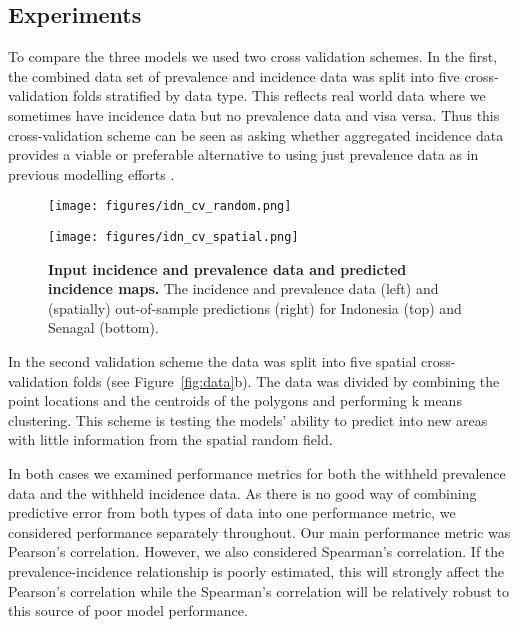 \documentclass[10pt,letterpaper]{article}
\begin{document}
\subsection*{Experiments}

To compare the three models we used two cross validation schemes. 
In the first, the combined data set of prevalence and incidence data was split into five cross-validation folds stratified by data type.
This reflects real world data where we sometimes have incidence data but no prevalence data and visa versa.
Thus this cross-validation scheme can be seen as asking whether aggregated incidence data provides a viable or preferable alternative to using just prevalence data as in previous modelling efforts \cite{bhatt2015effect}.


\begin{figure}[!h]
\centering
\begin{minipage}{0.45\textwidth} \centering 
\texttt{[image: figures/idn\_cv\_random.png]} %
\end{minipage}
\begin{minipage}{0.45\textwidth} \centering 
\texttt{[image: figures/idn\_cv\_spatial.png]} %
\end{minipage}

\caption{{\bf Input incidence and prevalence data and predicted incidence maps. } The incidence and prevalence data (left) and (spatially) out-of-sample predictions (right) for Indonesia (top) and Senagal (bottom).}
\label{fig1}
\end{figure}





In the second validation scheme the data was split into five spatial cross-validation folds (see Figure~\ref{fig:data}b).
The data was divided by combining the point locations and the centroids of the polygons and performing k means clustering.
This scheme is testing the models' ability to predict into new areas with little information from the spatial random field.

In both cases we examined performance metrics for both the withheld prevalence data and the withheld incidence data.
As there is no good way of combining predictive error from both types of data into one performance metric, we considered performance separately throughout.
Our main performance metric was Pearson's correlation.
However, we also considered Spearman's correlation.
If the prevalence-incidence relationship is poorly estimated, this will strongly affect the Pearson's correlation while the Spearman's correlation will be relatively robust to this source of poor model performance.
\end{document}

